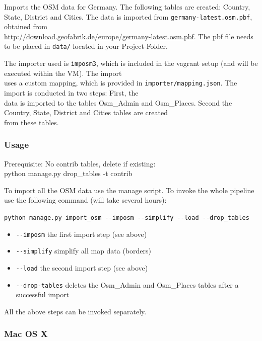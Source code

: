 \documentclass[paper=a4, fontsize=11pt]{scrartcl} %
\numberwithin{equation}{section} %
\numberwithin{figure}{section} %
\numberwithin{table}{section} %
\begin{document}
Imports the OSM data for Germany. The following tables are created:
Country, State, District and Cities. The data is imported from
\texttt{germany-latest.osm.pbf}, obtained from\\
\href{http://download.geofabrik.de/europe/germany-latest.osm.pbf}{http://download.geofabrik.de/europe/germany-latest.osm.pbf}.
 The pbf file needs to be
placed in \texttt{data/} located in your Project-Folder.

The importer used is \texttt{imposm3}, which is included in the vagrant
setup (and will be executed within the VM). The import\\uses a custom
mapping, which is provided in \texttt{importer/mapping.json}. The import
is conducted in two steps: First, the\\data is imported to the tables
Osm\_Admin and Osm\_Places. Second the Country, State, District and
Cities tables are created\\from these tables.

\subsubsection*{Usage}\label{usage}

Prerequisite: No contrib tables, delete if existing:\\ python manage.py
drop\_tables -t contrib

To import all the OSM data use the manage script. To invoke the whole
pipeline use the following command (will take several hours):

\texttt{python\ manage.py\ import\_osm\ -\/-imposm\ -\/-simplify\ -\/-load\ -\/-drop\_tables}

\begin{itemize}
\itemsep1pt\parskip0pt
\item
  \texttt{-\/-imposm} the first import step (see above)
\item
  \texttt{-\/-simplify} simplify all map data (borders)
\item
  \texttt{-\/-load} the second import step (see above)
\item
  \texttt{-\/-drop-tables} deletes the Osm\_Admin and Osm\_Places tables
  after a successful import
\end{itemize}

All the above steps can be invoked separately.

\subsubsection*{Mac OS X}\label{mac-os-x}
\end{document}
